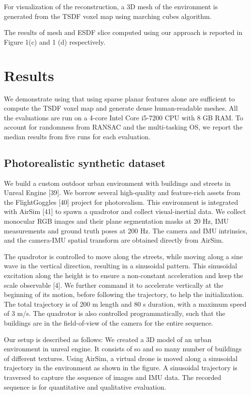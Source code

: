 For visualization of the reconstruction, a 3D mesh of the environment is generated from the TSDF voxel map using marching cubes algorithm.

The results of mesh and ESDF slice computed using our approach is reported in Figure 1(c) and 1 (d) respectively.

\section{Results}
We demonstrate using that using sparse planar features alone are sufficient to compute the TSDF voxel map and generate dense human-readable meshes. All the evaluations are run on a 4-core Intel Core i5-7200 CPU with 8 GB RAM. To account for randomness from RANSAC and the multi-tasking OS, we report the median results from five runs for each evaluation.

\subsection{Photorealistic synthetic dataset}
We build a custom outdoor urban environment with buildings and streets in Unreal Engine [39]. We borrow several high-quality and feature-rich assets from the FlightGoggles [40] project for photorealism. This environment is integrated with AirSim [41] to spawn a quadrotor and collect visual-inertial data. We collect monocular RGB images and their plane segmentation masks at 20 Hz, IMU measurements and ground truth poses at 200 Hz. The camera and IMU intrinsics, and the camera-IMU spatial transform are obtained directly from AirSim.

The quadrotor is controlled to move along the streets, while moving along a sine wave in the vertical direction, resulting in a sinusoidal pattern. This sinusoidal excitation
along the height is to ensure a non-constant acceleration and keep the scale observable [4]. We further command it to accelerate vertically at the beginning of its motion,
before following the trajectory, to help the initialization. The total trajectory is of 200 m length and 80 s duration, with a maximum speed of 3 m/s. The quadrotor is also controlled programmatically, such that the buildings are in the field-of-view of the camera for the entire sequence.


Our setup is described as follows:
We created a 3D model of an urban environment in unreal engine. It consists of so and so many number of buildings of different textures. Using AirSim, a virtual drone is moved along a sinusoidal trajectory in the environment as shown in the figure.
A sinusoidal trajectory is traversed to capture the sequence of images and IMU data. The recorded sequence is for quantitative and qualitative evaluation.

